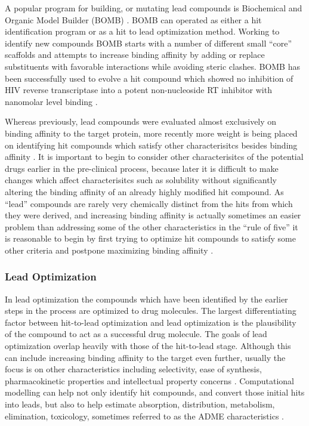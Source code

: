 A popular program for building, or mutating lead compounds is Biochemical and Organic Model Builder (BOMB) \cite{barreiro2007docking}.
BOMB can operated as either a hit identification program or as a hit to lead optimization method.
Working to identify new compounds BOMB starts with a number of different small ``core'' scaffolds and attempts to increase binding affinity by adding or replace substituents with favorable interactions while avoiding steric clashes.
BOMB has been successfully used to evolve a hit compound which showed no inhibition of HIV reverse transcriptase into a potent non-nucleoside RT inhibitor with nanomolar level binding \cite{barreiro2007docking}.

Whereas previously, lead compounds were evaluated almost exclusively on binding affinity to the target protein, more recently more weight is being placed on identifying hit compounds which satisfy other characterisitcs besides binding affinity \cite{bleicher2003hit}.
It is important to begin to consider other characterisitcs of the potential drugs earlier in the pre-clinical process, because later it is difficult to make changes which affect characterisitcs such as solubility without significantly altering the binding affinity of an already highly modified hit compound.
As ``lead'' compounds are rarely very chemically distinct from the hits from which they were derived, and increasing binding affinity is actually sometimes an easier problem than addressing some of the other characteristics in the ``rule of five'' it is reasonable to begin by first trying to optimize hit compounds to satisfy some other criteria and postpone maximizing binding affinity \cite{proudfoot2002drugs}.

\subsubsection{Lead Optimization}
\label{subsubsection:lead_optimization}
In lead optimization the compounds which have been identified by the earlier steps in the process are optimized to drug molecules.
The largest differentiating factor between hit-to-lead optimization and lead optimization is the plausibility of the compound to act as a successful drug molecule.
The goals of lead optimization overlap heavily with those of the hit-to-lead stage.
Although this can include increasing binding affinity to the target even further, usually the focus is on other characteristics including selectivity, ease of synthesis, pharmacokinetic properties and intellectual property concerns \cite{keserHu2006hit}.
Computational modelling can help not only identify hit compounds, and convert those initial hits into leads, but also to help estimate absorption, distribution, metabolism, elimination, toxicology, sometimes referred to as the ADME characteristics \cite{kerns2008drug}.

